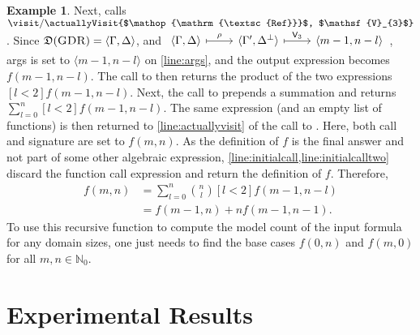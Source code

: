 \documentclass{article}
\theoremstyle{definition}
\newtheorem{example}{Example}
\theoremstyle{remark}
\newcommand{\Vone}{\mathsf{V}_{1}}
\newcommand{\Vthree}{\mathsf{V}_{3}}
\DeclareMathOperator{\GDR}{\textsc{GDR}}
\DeclareMathOperator{\Reff}{\textsc{Ref}}
\begin{document}
\begin{example}
  Next, \actuallyVisit{$\land$, $\Vthree$} calls
  $\visit/\actuallyVisit{$\Reff$, $\Vthree$}$. Since
  $\mathfrak{D}(\GDR) = \langle \Gamma, \Delta \rangle$, and
  $\begin{tikzcd} \langle\Gamma, \Delta\rangle \ar[r, mapsto, "\rho"] & \langle\Gamma', \Delta^{\bot}\rangle \ar[r, mapsto, "\Vthree"] & \langle m-1, n-l \rangle\end{tikzcd}$,
  \textsf{args} is set to $\langle m-1, n-l \rangle$ on \cref{line:args}, and
  the output expression becomes $f(m-1, n-l)$. The call to
  \actuallyVisit{$\land$, $\Vthree$} then returns the product of the two
  expressions $[l<2]f(m-1, n-l)$. Next, the call to \actuallyVisit{$\bigvee$,
    $\Vone$} prepends a summation and returns $\sum_{l=0}^{n}[l<2]f(m-1,n-l)$.
  The same expression (and an empty list of functions) is then returned to
  \cref{line:actuallyvisit} of the call to \visit{$\GDR$, $\Vone$}. Here, both
  \textsf{call} and \textsf{signature} are set to $f(m, n)$. As the definition
  of $f$ is the final answer and not part of some other algebraic expression,
  \cref{line:initialcall,line:initialcalltwo} discard the function call
  expression and return the definition of $f$. Therefore,
  \begin{align}
    f(m, n) &= \sum_{l = 0}^{n} \binom{n}{l} [l < 2] f(m-1, n-l)\nonumber \\
            &= f(m-1, n) + n f(m-1, n-1).\label{eq:solution}
  \end{align}
  To use this recursive function to compute the model count of the input formula
  for any domain sizes, one just needs to find the base cases $f(0, n)$ and
  $f(m, 0)$ for all $m, n \in \mathbb{N}_{0}$.
\end{example}

\section{Experimental Results}\label{sec:results}
\end{document}
